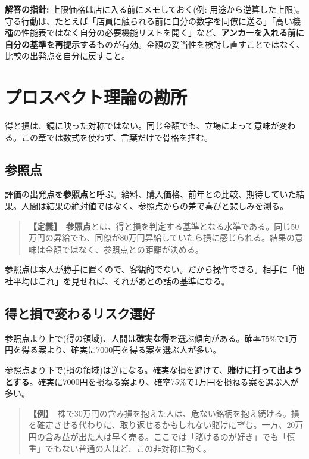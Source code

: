 \documentclass{article}
\begin{document}
\textbf{解答の指針:} 上限価格は店に入る前にメモしておく(例: 用途から逆算した上限)。守る行動は、たとえば「店員に触られる前に自分の数字を同僚に送る」「高い機種の性能表ではなく自分の必要機能リストを開く」など、\textbf{アンカーを入れる前に自分の基準を再提示する}ものが有効。金額の妥当性を検討し直すことではなく、比較の出発点を自分に戻すこと。

\section{プロスペクト理論の勘所}

得と損は、鏡に映った対称ではない。同じ金額でも、立場によって意味が変わる。この章では数式を使わず、言葉だけで骨格を掴む。

\subsection{参照点}

評価の出発点を\textbf{参照点}と呼ぶ。給料、購入価格、前年との比較、期待していた結果。人間は結果の絶対値ではなく、参照点からの差で喜びと悲しみを測る。

\begin{quote}
\textbf{【定義】}\ \textbf{参照点}とは、得と損を判定する基準となる水準である。同じ50万円の昇給でも、同僚が80万円昇給していたら損に感じられる。結果の意味は金額ではなく、参照点との距離が決める。
\end{quote}

参照点は本人が勝手に置くので、客観的でない。だから操作できる。相手に「他社平均はこれ」を見せれば、それがあとの話の基準になる。

\subsection{得と損で変わるリスク選好}

参照点より上で(得の領域)、人間は\textbf{確実な得}を選ぶ傾向がある。確率75\%で1万円を得る案より、確実に7000円を得る案を選ぶ人が多い。

参照点より下で(損の領域)は逆になる。確実な損を避けて、\textbf{賭けに打って出ようとする}。確実に7000円を損ねる案より、確率75\%で1万円を損ねる案を選ぶ人が多い。

\begin{quote}
\textbf{【例】}\ 株で30万円の含み損を抱えた人は、危ない銘柄を抱え続ける。損を確定させる代わりに、取り返せるかもしれない賭けに望む。一方、20万円の含み益が出た人は早く売る。ここでは「賭けるのが好き」でも「慎重」でもない普通の人ほど、この非対称に動く。
\end{quote}
\end{document}
